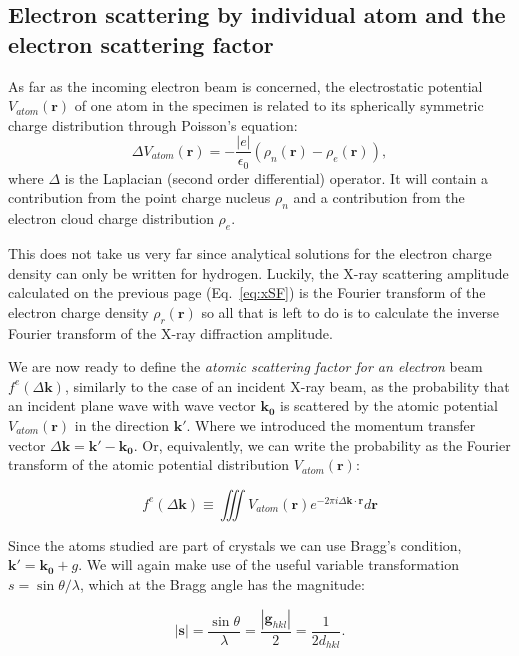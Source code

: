 %
\subsection{Electron scattering by individual atom and the electron scattering factor}

As far as the incoming electron beam is concerned, the electrostatic potential $V_{atom}(\mathbf{r})$ of one atom in the specimen is related to its spherically symmetric charge distribution through Poisson's equation:
\begin{equation}
\Delta V_{atom}(\mathbf{r})= - \frac{|e|}{\epsilon_0}\left(\rho _n(\mathbf{r}) - \rho_e(\mathbf{r})\right),
\label{eq:Poisson}
\end{equation}
where $\Delta$ is the Laplacian (second order differential) operator. It will contain a contribution from the point charge nucleus $\rho_n$ and a contribution from the electron cloud charge distribution $\rho_e$.

This does not take us very far since analytical solutions for the electron charge density can only be written for hydrogen. Luckily, the X-ray scattering amplitude calculated on the previous page (Eq.~\ref{eq:xSF}) is the Fourier transform of the electron charge density $\rho_r(\mathbf{r})$ so all that is left to do is to calculate the inverse Fourier transform of the X-ray diffraction amplitude.

We are now ready to define the \textit{atomic scattering factor for an electron} beam $f^e(\Delta \mathbf{k})$, similarly to the case of an incident X-ray beam, as the probability that an incident plane wave with wave vector $\mathbf{k_0}$ is scattered by the atomic potential $V_{atom}(\mathbf{r})$ in the direction $\mathbf{k'}$. Where we introduced the momentum transfer vector $\Delta \mathbf{k}=\mathbf{k'}-\mathbf{k_0}$. Or, equivalently, we can write the probability as the Fourier transform of the atomic potential distribution $V_{atom}(\mathbf{r})$:

\begin{equation}
f^e(\Delta \mathbf{k}) \equiv \iiint V_{atom}(\mathbf{r})e^{-2\pi i \Delta \mathbf{k} \cdot \mathbf{r}} d\mathbf{r}
\end{equation}

Since the atoms studied are part of crystals we can use Bragg's condition, $\mathbf{k'} = \mathbf{k_0}+g$. We will again make use of the useful variable transformation $s = \sin{\theta}/\lambda$, which at the Bragg angle has the magnitude:

\begin{equation}
|\mathbf{s}| = \frac{\sin{\theta}}{\lambda}=\frac{|\mathbf{g}_{hkl}|}{2}=\frac{1}{2 d_{hkl}}.
\label{eq:s}
\end{equation}

